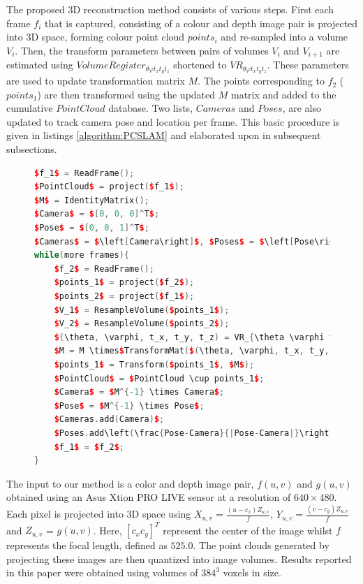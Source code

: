 \label{METHOD_SECLL}
The proposed 3D reconstruction method consists of various steps. First each frame $f_i$ that is captured, consisting of a colour and depth image pair is projected into 3D space, forming colour point cloud $points_i$ and re-sampled into a volume $V_i$. Then, the transform parameters between pairs of volumes $V_i$ and $V_{i+1}$ are estimated using $VolumeRegister_{\theta \varphi t_x t_y t_z}$ shortened to $VR_{\theta \varphi t_x t_y t_z}$. These parameters are used to update transformation matrix $M$. The points corresponding to $f_2$ ($points_1$) are then transformed using the updated $M$ matrix and added to the cumulative $PointCloud$ database. Two lists, $Cameras$ and $Poses$, are also updated to track camera pose and location per frame. This basic procedure is given in listings \ref{algorithm:PCSLAM} and elaborated upon in subsequent subsections.
\begin{figure}
\begin{lstlisting}[language=c++,caption=Phase Correlation Based SLAM Algorithm,label=algorithm:PCSLAM,mathescape,basicstyle=\ttfamily]
$f_1$ = ReadFrame();
$PointCloud$ = project($f_1$);
$M$ = IdentityMatrix();
$Camera$ = $[0, 0, 0]^T$;
$Pose$ = $[0, 0, 1]^T$;
$Cameras$ = $\left[Camera\right]$, $Poses$ = $\left[Pose\right]$;
while(more frames){
	$f_2$ = ReadFrame();
	$points_1$ = project($f_2$);
	$points_2$ = project($f_1$);
	$V_1$ = ResampleVolume($points_1$);
	$V_2$ = ResampleVolume($points_2$);
	$(\theta, \varphi, t_x, t_y, t_z) = VR_{\theta \varphi t_x t_y t_z}(V_1, V_2)$;
	$M = M \times$TransformMat($(\theta, \varphi, t_x, t_y, t_z)$);
	$points_1$ = Transform($points_1$, $M$);
	$PointCloud$ = $PointCloud \cup points_1$;
	$Camera$ = $M^{-1} \times Camera$;
	$Pose$ = $M^{-1} \times Pose$;
	$Cameras.add(Camera)$;
	$Poses.add\left(\frac{Pose-Camera}{|Pose-Camera|}\right)$;
	$f_1$ = $f_2$;
}
\end{lstlisting}
\end{figure}


The input to our method is a color and depth image pair, $f(u,v)$ and $g(u,v)$ obtained using an Asus Xtion PRO LIVE sensor at a resolution of $640 \times 480$. Each pixel is projected into 3D space using $X_{u,v} = \frac{(u - c_x)Z_{u,v}}{f}$, $Y_{u,v} = \frac{(v - c_y)Z_{u,v}}{f}$ and $Z_{u,v}$ = $g(u,v)$. 
Here, $[c_x c_y]^T$ represent the center of the image whilst $f$ represents the focal length, defined as $525.0$. The point clouds generated by projecting these images are then quantized into image volumes. Results reported in this paper were obtained using volumes of $384^3$ voxels in size.

